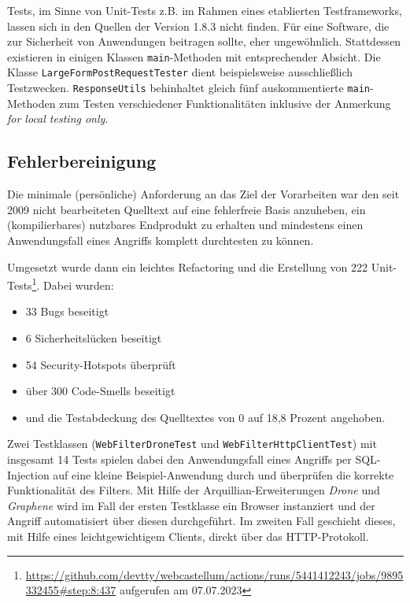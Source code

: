 Tests, im Sinne von Unit-Tests z.B. im Rahmen eines etablierten Testframeworks, lassen sich in den Quellen der Version 1.8.3 nicht finden. Für eine Software, die zur Sicherheit von Anwendungen beitragen sollte, eher ungewöhnlich. Stattdessen existieren in einigen Klassen \verb=main=-Methoden mit entsprechender Absicht. Die Klasse \verb=LargeFormPostRequestTester= dient beispielsweise ausschließlich Testzwecken. \verb=ResponseUtils= behinhaltet gleich fünf auskommentierte \verb=main=-Methoden zum Testen verschiedener Funktionalitäten inklusive der Anmerkung \emph{for local testing only}. 


\subsection{Fehlerbereinigung}

Die minimale (persönliche) Anforderung an das Ziel der Vorarbeiten war den seit 2009 nicht bearbeiteten Quelltext auf eine fehlerfreie Basis anzuheben, ein (kompilierbares) nutzbares Endprodukt zu erhalten und mindestens einen Anwendungsfall eines Angriffs komplett durchtesten zu können.

Umgesetzt wurde dann ein leichtes Refactoring und die Erstellung von 222 Unit-Tests\footnote{\url{https://github.com/devtty/webcastellum/actions/runs/5441412243/jobs/9895332455\#step:8:437} aufgerufen am 07.07.2023}. Dabei wurden:

\begin{itemize}
    \item 33 Bugs beseitigt
    \item 6 Sicherheitslücken beseitigt
    \item 54 Security-Hotspots überprüft
    \item über 300 Code-Smells beseitigt
    \item und die Testabdeckung des Quelltextes von 0 auf 18,8 Prozent angehoben.
\end{itemize}

Zwei Testklassen (\verb=WebFilterDroneTest= und \verb=WebFilterHttpClientTest=) mit insgesamt 14 Tests spielen dabei den Anwendungsfall eines Angriffs per SQL-Injection auf eine kleine Beispiel-Anwendung durch und überprüfen die korrekte Funktionalität des Filters. Mit Hilfe der Arquillian-Erweiterungen \emph{Drone} und \emph{Graphene} wird im Fall der ersten Testklasse ein Browser instanziert und der Angriff automatisiert über diesen durchgeführt. Im zweiten Fall geschieht dieses, mit Hilfe eines leichtgewichtigem Clients, direkt über das HTTP-Protokoll.

